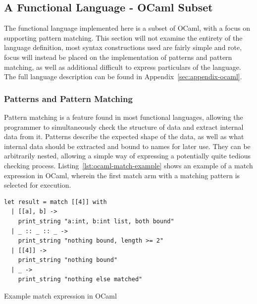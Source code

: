 \documentclass{kththesis}
\begin{document}

\subsection{A Functional Language - OCaml Subset} \label{sec:functional-eval}

The functional language implemented here is a subset of OCaml, with a focus on supporting pattern matching. This section will not examine the entirety of the language definition, most syntax constructions used are fairly simple and rote, focus will instead be placed on the implementation of patterns and pattern matching, as well as additional difficult to express particulars of the language. The full language description can be found in Appendix~\ref{sec:appendix-ocaml}.

\subsubsection{Patterns and Pattern Matching} \label{sec:functional-pattern-matching}

Pattern matching is a feature found in most functional languages, allowing the programmer to simultaneously check the structure of data and extract internal data from it. Patterns describe the expected shape of the data, as well as what internal data should be extracted and bound to names for later use. They can be arbitrarily nested, allowing a simple way of expressing a potentially quite tedious checking process. Listing~\ref{lst:ocaml-match-example} shows an example of a match expression in OCaml, wherein the first match arm with a matching pattern is selected for execution.

\begin{listing}[ht]
\begin{verbatim}
let result = match [[4]] with
  | [[a], b] ->
    print_string "a:int, b:int list, both bound"
  | _ :: _ :: _ ->
    print_string "nothing bound, length >= 2"
  | [[4]] ->
    print_string "nothing bound"
  | _ ->
    print_string "nothing else matched"
\end{verbatim}
\caption{Example match expression in OCaml}
\label{lst:ocaml-match-example}
\end{listing}
\end{document}
